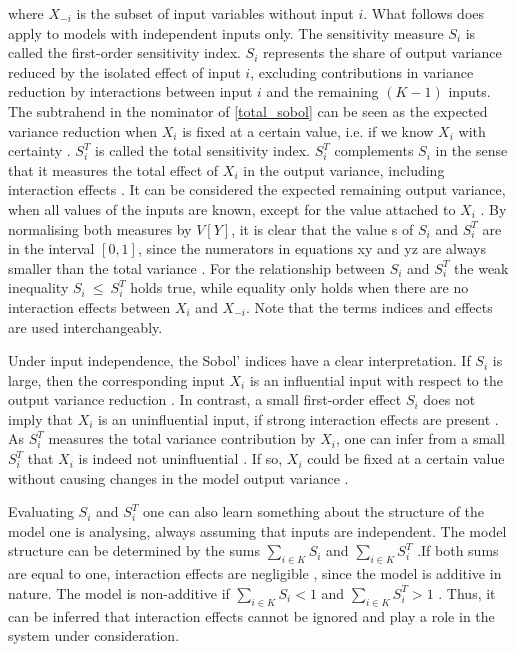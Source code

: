 \noindent where $X_{- i}$ is the subset of input variables without input $i$. What follows does apply to models with independent inputs only. The sensitivity measure $S_i$ is called the first-order sensitivity index. $S_i$ represents the share of output variance reduced by the isolated effect of input $i$, excluding contributions in variance reduction by interactions between input $i$ and the remaining $(K-1)$ inputs. The subtrahend in the nominator of \cref{total_sobol} can be seen as the expected variance reduction when $X_i$ is fixed at a certain value, i.e. if we know $X_i$ with certainty \citep{SNS16}. $S_i^T$ is called the total sensitivity index. $S_i^T$ complements $S_i$ in the sense that it measures the total effect of $X_i$ in the output variance, including interaction effects \citep{SNS16}. It can be considered the expected remaining output variance, when all values of the inputs are known, except for the value attached to $X_i$ \citep{SNS16}. By normalising both measures by $V[Y]$, it is clear that the value s of $S_i$ and $S_i^T$ are in the interval $[0, 1]$, since the numerators in equations xy and yz are always smaller than the total variance \citep{GM17}. For the relationship between $S_i$ and $S_i^T$ the weak inequality $S_i\ \le\ S_i^T$ holds true, while equality only holds when there are no interaction effects between $X_i$ and $X_{- i}$. Note that the terms indices and effects are used interchangeably.

Under input independence, the Sobol' indices have a clear interpretation. If $S_i$ is large, then the corresponding input $X_i$ is an influential input with respect to the output variance reduction \citep{GM17}. In contrast, a small first-order effect $S_i$ does not imply that $X_i$ is an uninfluential input, if strong interaction effects are present \citep{GM17}. As $S_i^T$ measures the total variance contribution by $X_i$, one can infer from a small $S_i^T$ that $X_i$ is indeed not uninfluential \citep{GM17}. If so, $X_i$ could be fixed at a certain value without causing changes in the model output variance \citep{GM17}.

Evaluating $S_i$ and $S_i^T$ one can also learn something about the structure of the model one is analysing, always assuming that inputs are independent. The model structure can be determined by the sums $\sum_{i \in K} S_i$ and $\sum_{i \in K} S_i^T$ \citep{GM17}.If both sums are equal to one, interaction effects are negligible , since the model is additive in nature. The model is non-additive if $\sum_{i \in K} S_i < 1$ and $\sum_{i \in K} S_i^T > 1$ \citep{GM17}. Thus, it can be inferred that interaction effects cannot be ignored and play a role in the system under consideration.


